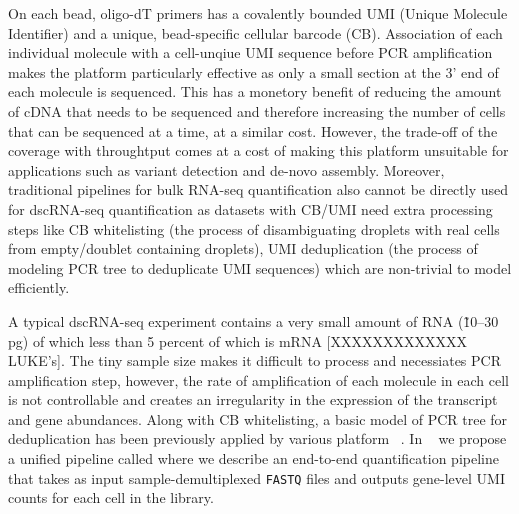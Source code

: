 On each bead, oligo-dT primers has a covalently bounded UMI (Unique Molecule Identifier) and a unique, bead-specific cellular barcode (CB). Association of each individual molecule with a cell-unqiue UMI sequence before PCR amplification makes the platform particularly effective as only a small section at the 3' end of each molecule is sequenced. This has a monetory benefit of reducing the amount of cDNA that needs to be sequenced and therefore increasing the number of cells that can be sequenced at a time, at a similar cost. However, the trade-off of the coverage with throughtput comes at a cost of making this platform unsuitable for applications such as variant detection and de-novo assembly. Moreover, traditional pipelines for bulk RNA-seq quantification also cannot be directly used for dscRNA-seq quantification as datasets with CB/UMI need extra processing steps like CB whitelisting (the process of disambiguating droplets with real cells from empty/doublet containing droplets), UMI deduplication (the process of modeling PCR tree to deduplicate UMI sequences) which are non-trivial to model efficiently.

A typical dscRNA-seq experiment contains a very small amount of RNA (\~ 10--30 pg) of which less than 5 percent of which is mRNA [XXXXXXXXXXXXX LUKE's]. The tiny sample size makes it difficult to process and necessiates PCR amplification step, however, the rate of amplification of each molecule in each cell is not controllable and creates an irregularity in the expression of the transcript and gene abundances. Along with CB whitelisting, a basic model of PCR tree for deduplication has been previously applied by various platform ~\citep{dropseq, tenx}. In ~ we propose a unified pipeline called \alevin where we describe an end-to-end quantification pipeline that takes as input sample-demultiplexed \texttt{FASTQ} files and outputs gene-level UMI counts for each cell in the library.